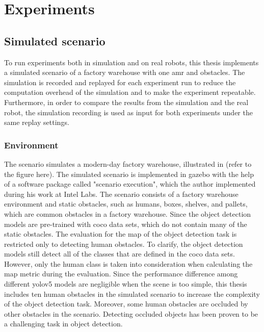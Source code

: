 \chapter{Experiments}\label{ch:experiment}

\section{Simulated scenario}

To run experiments both in simulation and on real robots, this thesis implements a simulated scenario of a factory warehouse with one \gls{amr} and obstacles. The simulation is recorded and replayed for each experiment run to reduce the computation overhead of the simulation and to make the experiment repeatable. Furthermore, in order to compare the results from the simulation and the real robot, the simulation recording is used as input for both experiments under the same replay settings. 

\subsection{Environment}

The scenario simulates a modern-day factory warehouse, illustrated in (refer to the figure here). The simulated scenario is implemented in \gls{gazebo} with the help of a software package called "scenario execution", which the author implemented during his work at Intel Labs. The scenario consists of a factory warehouse environment and static obstacles, such as humans, boxes, shelves, and pallets, which are common obstacles in a factory warehouse. Since the object detection models are pre-trained with \gls{coco} data sets, which do not contain many of the static obstacles. The evaluation for the \gls{map} of the object detection task is restricted only to detecting human obstacles. To clarify, the object detection models still detect all of the classes that are defined in the \gls{coco} data sets. However, only the human class is taken into consideration when calculating the \gls{map} metric during the evaluation. Since the performance difference among different \gls{yolov5} models are negligible when the scene is too simple, this thesis includes ten human obstacles in the simulated scenario to increase the complexity of the object detection task. Moreover, some human obstacles are occluded by other obstacles in the scenario. Detecting occluded objects has been proven to be a challenging task in object detection. 

